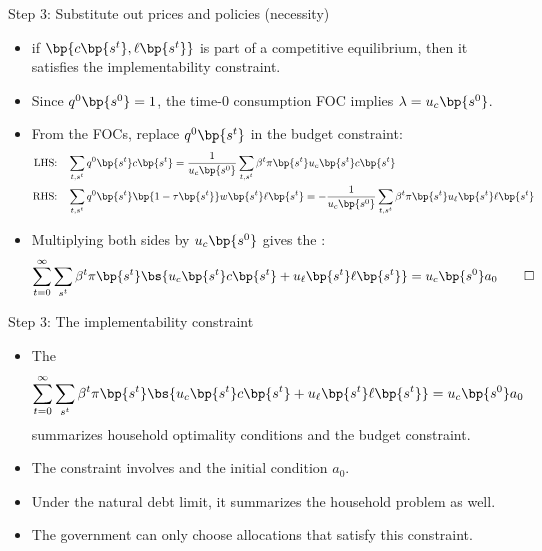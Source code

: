 \documentclass[11pt,xcolor={dvipsnames},aspectratio=159,hyperref={pdftex,pdfpagemode=UseNone,hidelinks,pdfdisplaydoctitle=true},usepdftitle=false]{beamer}
\begin{document}
        \begin{frame}{Step 3: Substitute out prices and policies (necessity)}
                \begin{itemize}
                \item {} if $\bp{c\bp{s^t}, \ell\bp{s^t}}$ is part of a competitive equilibrium, then it satisfies the implementability constraint.
                \item Since $q^0\bp{s^0}=1$, the time-0 consumption FOC implies $\lambda = u_c\bp{s^0}$.
                \item From the FOCs, replace $q^0\bp{s^t}$ in the budget constraint:
                \begin{align*}
                    \text{LHS:} \quad & \sum_{t,s^t} q^0\bp{s^t} c\bp{s^t} = \frac{1}{u_c\bp{s^0}}\sum_{t,s^t}  \beta^t \pi\bp{s^t} u_c \bp{s^t} c\bp{s^t}  \\
                    \text{RHS:} \quad & \sum_{t,s^t} q^0\bp{s^t} \bp{1-\tau\bp{s^t}} w\bp{s^t} \ell\bp{s^t} = -\frac{1}{u_c\bp{s^0}}\sum_{t,s^t}  \beta^t \pi\bp{s^t} u_{\ell} \bp{s^t} \ell\bp{s^t}
                \end{align*}
                \item Multiplying both sides by $u_c\bp{s^0}$ gives the :
                 \begin{align*}
                    \sum_{t=0}^\infty \sum_{s^t} \beta^t \pi\bp{s^t} \bs{  u_c \bp{s^t} c\bp{s^t}  + u_{\ell} \bp{s^t} \ell\bp{s^t}}  = u_c \bp{s^0} a_0 \qquad \square
                \end{align*}
                \end{itemize}
            \end{frame}
            \begin{frame}{Step 3: The implementability constraint}
                \begin{itemize}
                    \item The 
                    \begin{align*}
                        \sum_{t=0}^\infty \sum_{s^t} \beta^t  \pi\bp{s^t} \bs{  u_c \bp{s^t} c\bp{s^t}  + u_{\ell} \bp{s^t} \ell\bp{s^t}}  = u_c \bp{s^0} a_0
                    \end{align*}
                summarizes household optimality conditions and the budget constraint.
                \item {} The constraint involves  and the initial condition $a_0$.
                \item Under the natural debt limit, it summarizes the  household problem as well.
                \item The government can only choose allocations that satisfy this constraint.
                \end{itemize}
            \end{frame}
\end{document}
